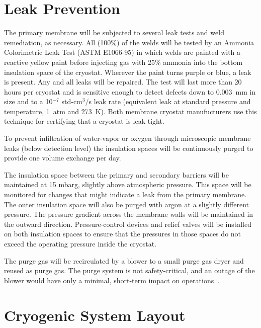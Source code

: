 \chapter{Leak Prevention}
\label{sec:cryo-cryosys-leak}

The primary membrane will be subjected to several leak tests 
and weld remediation, as necessary. All (100\%) of the welds 
will be tested by an Ammonia Colorimetric Leak Test (ASTM E1066-95) 
in which welds are painted with a reactive yellow paint before 
injecting gas with 25\% ammonia into the bottom insulation space 
of the cryostat.  Wherever the paint turns purple or blue, a leak 
is present. Any and all leaks will be repaired. The test will last 
more than 20 hours per cryostat and is sensitive enough to 
detect defects down to 0.003~mm in size and to a 10$^{-7}$ 
std-cm$^3$/s leak rate (equivalent leak at standard pressure 
and temperature, 1~atm and 273~K). Both membrane cryostat 
manufucturers use this technique for certifying that 
a cryostat is leak-tight.


To prevent infiltration of water-vapor or oxygen through 
microscopic membrane leaks (below detection level) the 
insulation spaces will be continuously purged to provide 
one volume exchange per day.  

The insulation space between the primary and 
secondary barriers will be maintained at 15 mbarg,  
slightly above atmospheric pressure. This space will
be monitored for changes that might indicate a leak 
from the primary membrane.  The outer insulation space 
will also be purged with argon at a slightly different 
pressure. The pressure gradient across the membrane walls 
will be maintained in the outward direction. Pressure-control 
devices and relief valves will be installed on both insulation 
spaces to ensure that the pressures in those spaces do not 
exceed the operating pressure inside the cryostat. 

The purge gas will be recirculated by a blower to a small 
purge gas dryer and reused as purge gas. The purge system 
is not safety-critical, and an outage of the blower would 
have only a minimal, short-term impact on operations~\cite{docdb4303}.

\chapter{Cryogenic System Layout}
\label{sec:cryo-cryosys-layout}

